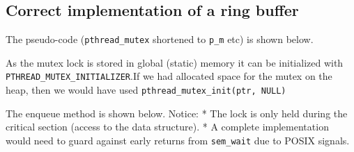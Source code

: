 \subsection{Correct implementation of a ring
buffer}\label{correct-implementation-of-a-ring-buffer}

The pseudo-code (\texttt{pthread\_mutex} shortened to \texttt{p\_m} etc)
is shown below.

As the mutex lock is stored in global (static) memory it can be
initialized with \texttt{PTHREAD\_MUTEX\_INITIALIZER}.If we had
allocated space for the mutex on the heap, then we would have used
\texttt{pthread\_mutex\_init(ptr,\ NULL)}

\begin{Shaded}
\begin{Highlighting}[]

 
 

 
  \NormalTok{, }\NormalTok{)}
  \NormalTok{, }\NormalTok{)}
\NormalTok{\}}
\end{Highlighting}
\end{Shaded}

The enqueue method is shown below. Notice: * The lock is only held
during the critical section (access to the data structure). * A complete
implementation would need to guard against early returns from
\texttt{sem\_wait} due to POSIX signals.

\begin{Shaded}
\begin{Highlighting}[]
 

 \NormalTok{b[ (in++) & (N}\NormalTok{) ] = value}

\NormalTok{\}}
\end{Highlighting}
\end{Shaded}

